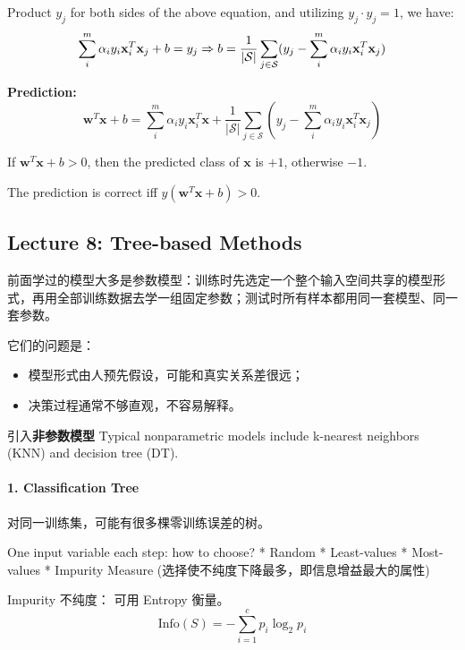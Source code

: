 \documentclass[
]{ctexart}
\providecommand{\tightlist}{%
  \setlength{\itemsep}{0pt}\setlength{\parskip}{0pt}}
\begin{document}
Product \(y_j\) for both sides of the above equation, and utilizing
\(y_j \cdot y_j = 1\), we have:
\[\sum_{i}^m \alpha_i y_i \mathbf{x}_i^T \mathbf{x}_j + b = y_j \\
\Rightarrow b = \frac{1}{|\mathcal{S}|} \sum_{j \in \mathcal{S}} (y_j - \sum_{i}^m \alpha_i y_i \mathbf{x}_i^T \mathbf{x}_j)\]

\textbf{Prediction:}
\[\mathbf{w}^T \mathbf{x} + b = \sum_{i}^m \alpha_i y_i \mathbf{x}_i^T \mathbf{x} + \frac{1}{|\mathcal{S}|} \sum_{j \in \mathcal{S}} (y_j - \sum_{i}^m \alpha_i y_i \mathbf{x}_i^T \mathbf{x}_j)\]

If \(\mathbf{w}^T \mathbf{x} + b > 0\), then the predicted class of
\(\mathbf{x}\) is \(+1\), otherwise \(-1\).

The prediction is correct iff \(y(\mathbf{w}^T \mathbf{x} + b) > 0\).


\clearpage

\subsection{Lecture 8: Tree-based
Methods}\label{lecture-8-tree-based-methods}

前面学过的模型大多是参数模型：训练时先选定一个整个输入空间共享的模型形式，再用全部训练数据去学一组固定参数；测试时所有样本都用同一套模型、同一套参数。

它们的问题是：

\begin{itemize}
\tightlist
\item
  模型形式由人预先假设，可能和真实关系差很远；
\item
  决策过程通常不够直观，不容易解释。
\end{itemize}

引入\textbf{非参数模型} Typical nonparametric models include k-nearest
neighbors (KNN) and decision tree (DT).

\paragraph{1. Classification Tree}\label{classification-tree}

对同一训练集，可能有很多棵零训练误差的树。

One input variable each step: how to choose? * Random * Least-values *
Most-values * Impurity Measure
(选择使不纯度下降最多，即信息增益最大的属性)

Impurity 不纯度： 可用 Entropy 衡量。
\[\text{Info}(S) = -\sum_{i=1}^c p_i \log_2 p_i\]
\end{document}
